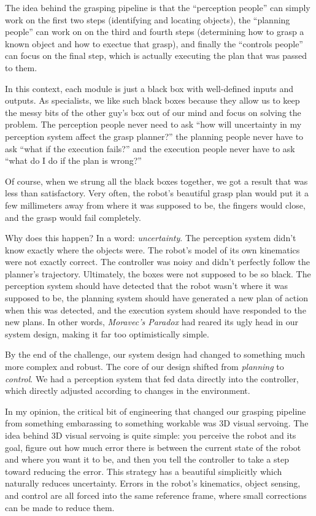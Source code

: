 The idea behind the grasping pipeline is that the ``perception people'' can simply work on the first two steps (identifying and locating objects), the ``planning people'' can work on on the third and fourth steps (determining how to grasp a known object and how to exectue that grasp), and finally the ``controls people'' can focus on the final step, which is actually executing the plan that was passed to them. 

In this context, each module is just a black box with well-defined inputs and outputs. As specialists, we like such black boxes because they allow us to keep the messy bits of the other guy's box out of our mind and focus on solving the problem. The perception people never need to ask ``how will uncertainty in my perception system affect the grasp planner?'' the planning people never have to ask ``what if the execution fails?'' and the execution people never have to ask ``what do I do if the plan is wrong?''

Of course, when we strung all the black boxes together, we got a result that was less than satisfactory. Very often, the robot's beautiful grasp plan would put it a few millimeters away from where it was supposed to be, the fingers would close, and the grasp would fail completely. 

Why does this happen? In a word: \textit{uncertainty}. The perception system didn't know exactly where the objects were. The robot's model of its own kinematics were not exactly correct. The controller was noisy and didn't perfectly follow the planner's trajectory. Ultimately, the boxes were not supposed to be so black. The perception system should have detected that the robot wasn't where it was supposed to be, the planning system should have generated a new plan of action when this was detected, and the execution system should have responded to the new plans. In other words, \textit{Moravec's Paradox} had reared its ugly head in our system design, making it far too optimistically simple.

By the end of the challenge, our system design had changed to something much more complex and robust. The core of our design shifted from \textit{planning} to \textit{control}. We had a perception system that fed data directly into the controller, which directly adjusted according to changes in the environment. 

In my opinion, the critical bit of engineering that changed our grasping pipeline from something embarassing to something workable was 3D visual servoing. The idea behind 3D visual servoing is quite simple: you perceive the robot and its goal, figure out how much error there is between the current state of the robot and where you want it to be, and then you tell the controller to take a step toward reducing the error. This strategy has a beautiful simplicitly which naturally reduces uncertainty. Errors in the robot's kinematics, object sensing, and control are all forced into the same reference frame, where small corrections can be made to reduce them. 

